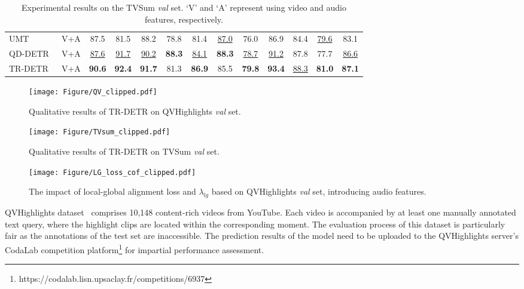 \begin{table*}[!ht]
\begin{tabular}{lcccccccccccc}
        UMT~\cite{liu2022umt} & V+A & 87.5 & 81.5 & 88.2 & 78.8 & 81.4 & \underline{87.0} & 76.0 & 86.9 & 84.4 & \underline{79.6} & 83.1 \\
        QD-DETR~\cite{moon2023query} & V+A & \underline{87.6} & \underline{91.7} & \underline{90.2} & \textbf{88.3} & \underline{84.1} & \textbf{88.3} & \underline{78.7} & \underline{91.2} & 87.8 & 77.7 & \underline{86.6} \\
        \rowcolor[rgb]{0.78,0.78,0.78} TR-DETR & V+A & \textbf{90.6} & \textbf{92.4} & \textbf{91.7} & 81.3 & \textbf{86.9} & 85.5 & \textbf{79.8} & \textbf{93.4} & \underline{88.3} & \textbf{81.0} & \textbf{87.1} \\
        \bottomrule
    \end{tabular}
    \caption{Experimental results on the TVSum \emph{val} set. `V' and `A' represent using video and audio features, respectively.}
    \label{results_TV}
\end{table*}

\begin{figure*}[!ht]
\centering
\texttt{[image: Figure/QV\_clipped.pdf]} %
\caption{Qualitative results of TR-DETR on QVHighlights \emph{val} set.}
\label{qualative_QV}
\end{figure*}

\begin{figure*}[!ht]
\centering
\texttt{[image: Figure/TVsum\_clipped.pdf]} %
\caption{Qualitative results of TR-DETR on TVSum \emph{val} set.}
\label{qualative_TV}
\end{figure*}

\begin{figure}[!ht]
\centering
\texttt{[image: Figure/LG\_loss\_cof\_clipped.pdf]} %
\caption{The impact of local-global alignment loss and $\lambda_{lg}$ based on QVHighlights \emph{val} set, introducing audio features. }
\label{cof_abi}
\end{figure}
QVHighlights dataset~\cite{lei2021detecting} comprises 10,148 content-rich videos from YouTube. Each video is accompanied by at least one manually annotated text query, where the highlight clips are located within the corresponding moment. The evaluation process of this dataset is particularly fair as the annotations of the test set are inaccessible. The prediction results of the model need to be uploaded to the QVHighlights server's CodaLab competition platform\footnote{https://codalab.lisn.upsaclay.fr/competitions/6937} for impartial performance assessment.

